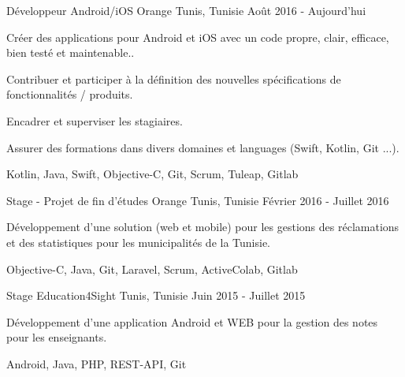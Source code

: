 

\begin{cventries}

  \cventrydetailed
    {Développeur Android/iOS} %
    {Orange} %
    {Tunis, Tunisie} %
    {Août 2016 - Aujourd'hui} %
    {
      \begin{cvitems} %
        \item {Créer des applications pour Android et iOS avec un code propre, clair, efficace, bien testé et maintenable..}
        \item {Contribuer et participer à la définition des nouvelles spécifications de fonctionnalités / produits.}
        \item {Encadrer et superviser les stagiaires.}
        \item {Assurer des formations dans divers domaines et languages (Swift, Kotlin, Git ...).}
      \end{cvitems}
    }
    {Kotlin, Java, Swift, Objective-C, Git, Scrum, Tuleap, Gitlab} %
    
  \cventrydetailed
    {Stage - Projet de fin d'études} %
    {Orange} %
    {Tunis, Tunisie} %
    {Février 2016 - Juillet 2016} %
    {
      \begin{cvitems} %
        \item {Développement d’une solution (web et mobile) pour les gestions des réclamations et des statistiques pour les municipalités de la Tunisie.}
      \end{cvitems}
    }
    {Objective-C, Java, Git, Laravel, Scrum, ActiveColab, Gitlab} %

  \cventrydetailed
    {Stage} %
    {Education4Sight} %
    {Tunis, Tunisie} %
    {Juin 2015 - Juillet 2015} %
    {
    	\begin{cvitems} %
    		\item {Développement d’une application Android et WEB pour la gestion des notes pour les enseignants.}
    	\end{cvitems}
    }
    {Android, Java, PHP, REST-API, Git} %

\end{cventries}

